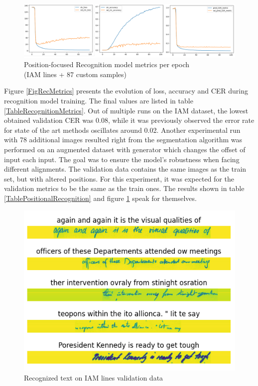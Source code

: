 \begin{figure}[htbp]
    \centering
        \includegraphics[scale=0.35]{figures/metrics_recog.png}
    \caption{Position-focused Recognition model metrics per epoch \\ (IAM lines + 87 custom samples)}    
    \label{FigPosRecMetrics}
\end{figure}


Figure \ref{FigRecMetrics} presents the evolution of loss, accuracy and CER during recognition model training. The final values are listed in table \ref{TableRecognitionMetrics}. Out of multiple runs on the IAM dataset, the lowest obtained validation CER was 0.08, while it was previously observed the error rate for state of the art methods oscillates around 0.02. Another experimental run with 78 additional images resulted right from the segmentation algorithm was performed on an augmented dataset with generator which changes the offset of input each input. The goal was to ensure the model's robustness when facing different alignments. The validation data contains the same images as the train set, but with altered positions. For this experiment, it was expected for the validation metrics to be the same as the train ones. The results shown in table \ref{TablePositionalRecognition} and figure \ref{FigPosRecMetrics} speak for themselves.


\begin{figure}
    \centering
    \includegraphics[width=0.7\linewidth]{figures/iam_val_out.png}
    \caption{Recognized text on IAM lines validation data}
    \label{FigIamValOut}
\end{figure}


